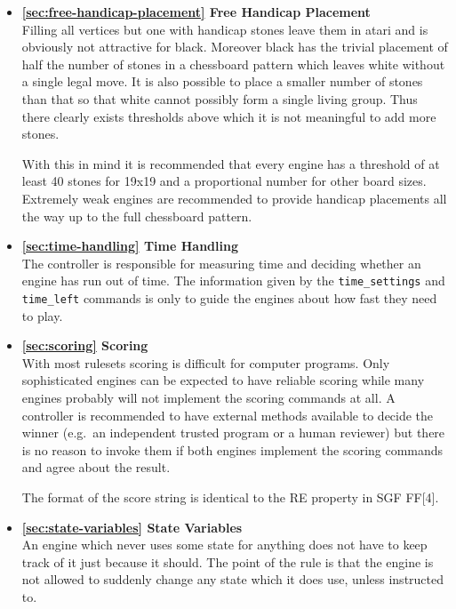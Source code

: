 \documentclass[a4paper]{article}
\begin{document}
\begin{itemize}
\item \textbf{\ref{sec:free-handicap-placement} Free Handicap Placement} \\
  Filling all vertices but one with handicap stones leave them in
  atari and is obviously not attractive for black. Moreover black has
  the trivial placement of half the number of stones in a chessboard
  pattern which leaves white without a single legal move. It is also
  possible to place a smaller number of stones than that so that white
  cannot possibly form a single living group. Thus there clearly
  exists thresholds above which it is not meaningful to add more
  stones.
  
  With this in mind it is recommended that every engine has a
  threshold of at least 40 stones for 19x19 and a proportional number
  for other board sizes. Extremely weak engines are recommended to
  provide handicap placements all the way up to the full chessboard
  pattern.
  
\item \textbf{\ref{sec:time-handling} Time Handling} \\
  The controller is responsible for measuring time and deciding
  whether an engine has run out of time. The information given by the
  \texttt{time\_settings} and \texttt{time\_left} commands is only to
  guide the engines about how fast they need to play.
  
\item \textbf{\ref{sec:scoring} Scoring} \\
  With most rulesets scoring is difficult for computer programs. Only
  sophisticated engines can be expected to have reliable scoring while
  many engines probably will not implement the scoring commands at
  all. A controller is recommended to have external methods available
  to decide the winner (e.g.\ an independent trusted program or a
  human reviewer) but there is no reason to invoke them if both
  engines implement the scoring commands and agree about the result.

  The format of the score string is identical to the RE property in
  SGF FF[4].
  
\item \textbf{\ref{sec:state-variables} State Variables} \\
  An engine which never uses some state for anything does not have to
  keep track of it just because it should. The point of the rule is
  that the engine is not allowed to suddenly change any state which it
  does use, unless instructed to.


\end{itemize}
\end{document}
